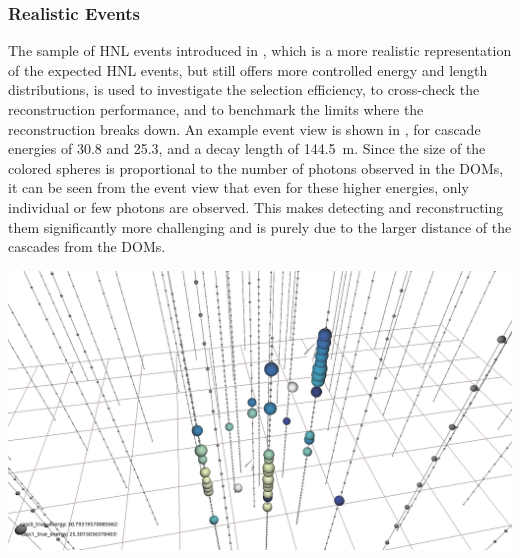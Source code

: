 \subsubsection{Realistic Events}

The sample of HNL events introduced in , which is a more realistic representation of the expected HNL events, but still offers more controlled energy and length distributions, is used to investigate the selection efficiency, to cross-check the reconstruction performance, and to benchmark the limits where the reconstruction breaks down. An example event view is shown in , for cascade energies of \SI{30.8}{\gev} and \SI{25.3}{\gev}, and a decay length of \SI{144.5}{\meter}. Since the size of the colored spheres is proportional to the number of photons observed in the DOMs, it can be seen from the event view that even for these higher energies, only individual or few photons are observed. This makes detecting and reconstructing them significantly more challenging and is purely due to the larger distance of the cascades from the DOMs.

\begin{marginfigure}
    \centering
    \includegraphics[trim=230 45 230 65, clip]{figures/model_independent_simulation/diagonal_e0_30.8_e1_25.3_v0.png}
    \caption[Event view of a realistic double-cascade event]{Event view of a realistic double-cascade event, with cascade energies of \SI{30.8}{\gev} and \SI{25.3}{\gev}, and a decay length of \SI{144.5}{\meter}. The colored spheres show the DOMs that have observed light, where the size is proportional to the number of observed photons and the color indicates the time (yellow is early, blue is late). The strings are shown as black lines, with small spheres indicating the DOM positions, and the true cascade vertices and directions are shown as white spheres with white arrows.}
\end{marginfigure}


